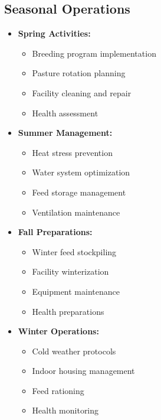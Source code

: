 \subsection{Seasonal Operations}
\begin{itemize}
    \item \textbf{Spring Activities:}
    \begin{itemize}
        \item Breeding program implementation
        \item Pasture rotation planning
        \item Facility cleaning and repair
        \item Health assessment
    \end{itemize}
    
    \item \textbf{Summer Management:}
    \begin{itemize}
        \item Heat stress prevention
        \item Water system optimization
        \item Feed storage management
        \item Ventilation maintenance
    \end{itemize}
    
    \item \textbf{Fall Preparations:}
    \begin{itemize}
        \item Winter feed stockpiling
        \item Facility winterization
        \item Equipment maintenance
        \item Health preparations
    \end{itemize}
    
    \item \textbf{Winter Operations:}
    \begin{itemize}
        \item Cold weather protocols
        \item Indoor housing management
        \item Feed rationing
        \item Health monitoring
    \end{itemize}
\end{itemize}

